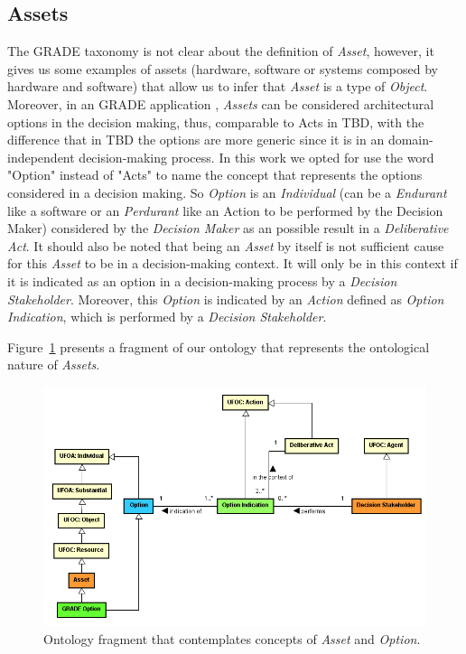 \subsection{Assets}

The GRADE taxonomy is not clear about the definition of \textit{Asset}, however, it gives us some examples of assets (hardware, software or systems composed by hardware and software) that allow us to infer that \textit{Asset} is a type of \textit{Object}.   Moreover, in an GRADE application , \textit{Assets} can be considered architectural options in the decision making, thus, comparable to Acts in TBD, with the difference that in TBD the options are more generic since it is in an domain-independent decision-making process. In this work we opted for use the word "Option" instead of "Acts" to name the concept that represents the options considered in a decision making. So \textit{Option} is an \textit{Individual} (can be a \textit{Endurant} like a software or an \textit{Perdurant} like an Action to be performed by the Decision Maker) considered by the \textit{Decision Maker} as an possible result in a \textit{Deliberative Act}.
It should also be noted that being an \textit{Asset} by itself is not sufficient cause for this \textit{Asset} to be in a decision-making context. It will only be in this context if it is indicated as an option in a decision-making process by a \textit{Decision Stakeholder}. Moreover, this \textit{Option} is indicated by an \textit{Action} defined as \textit{Option Indication}, which is performed by a \textit{Decision Stakeholder}.

Figure~\ref{fig-ontology-assets} presents a fragment of our ontology that represents the ontological nature of \textit{Assets}.


\begin{figure}
	\centering
	\includegraphics[width=\textwidth]{figuras/fig-ontology-assets} 
	\caption{Ontology fragment that contemplates concepts of \textit{Asset} and \textit{Option}.}
	\label{fig-ontology-assets}
\end{figure}

